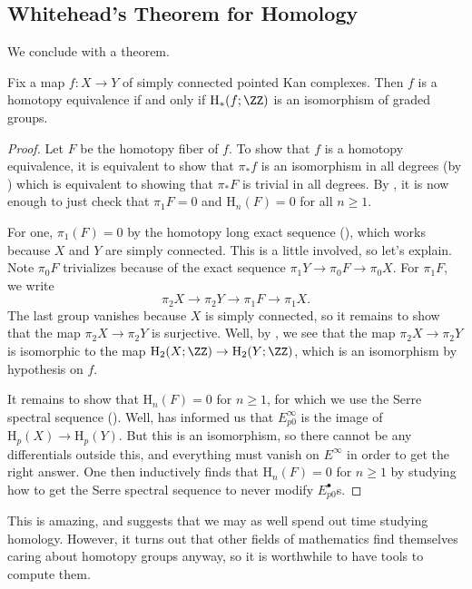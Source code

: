 \documentclass[../notes.tex]{subfiles}
\begin{document}
\subsection{Whitehead's Theorem for Homology}
We conclude with a theorem.
\begin{theorem} \label{thm:whitehead-homology}
	Fix a map $f\colon X\to Y$ of simply connected pointed Kan complexes. Then $f$ is a homotopy equivalence if and only if $\mathrm H_*(f;\ZZ)$ is an isomorphism of graded groups.
\end{theorem}
\begin{proof}
	Let $F$ be the homotopy fiber of $f$. To show that $f$ is a homotopy equivalence, it is equivalent to show that $\pi_*f$ is an isomorphism in all degrees (by ) which is equivalent to showing that $\pi_*F$ is trivial in all degrees. By , it is now enough to just check that $\pi_1F=0$ and $\mathrm H_n(F)=0$ for all $n\ge1$.
	
	For one, $\pi_1(F)=0$ by the homotopy long exact sequence (), which works because $X$ and $Y$ are simply connected. This is a little involved, so let's explain. Note $\pi_0F$ trivializes because of the exact sequence $\pi_1Y\to\pi_0F\to\pi_0X$. For $\pi_1F$, we write
	\[\pi_2X\to\pi_2Y\to\pi_1F\to\pi_1X.\]
	The last group vanishes because $X$ is simply connected, so it remains to show that the map $\pi_2X\to\pi_2Y$ is surjective. Well, by , we see that the map $\pi_2X\to\pi_2Y$ is isomorphic to the map $\mathrm H_2(X;\ZZ)\to\mathrm H_2(Y;\ZZ)$, which is an isomorphism by hypothesis on $f$.

	It remains to show that $\mathrm H_n(F)=0$ for $n\ge1$, for which we use the Serre spectral sequence (). Well,  has informed us that $E^\infty_{p0}$ is the image of $\mathrm H_p(X)\to\mathrm H_p(Y)$. But this is an isomorphism, so there cannot be any differentials outside this, and everything must vanish on $E^\infty$ in order to get the right answer. One then inductively finds that $\mathrm H_n(F)=0$ for $n\ge1$ by studying how to get the Serre spectral sequence to never modify $E^\bullet_{p0}$s.
\end{proof}
\begin{remark}
	This is amazing, and suggests that we may as well spend out time studying homology. However, it turns out that other fields of mathematics find themselves caring about homotopy groups anyway, so it is worthwhile to have tools to compute them.
\end{remark}
\end{document}
